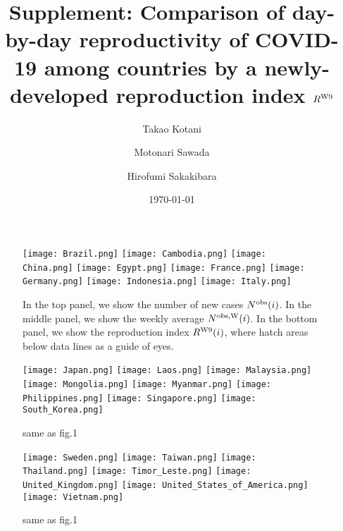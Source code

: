 \documentclass[twocolumn,superscriptaddress,showpacs,preprintnumbers,amsmath,amssymb,prb]{revtex4-1}
\begin{document}
\title{Supplement: Comparison of day-by-day reproductivity of COVID-19 among countries
by a newly-developed reproduction index $R^{\rm W9}$}
\author{Takao Kotani}
\author{Motonari Sawada}
\author{Hirofumi Sakakibara}



\date{\today}
\maketitle




\begin{figure*}[ht]
\texttt{[image: Brazil.png]}
\texttt{[image: Cambodia.png]}
\texttt{[image: China.png]}
\texttt{[image: Egypt.png]}
\texttt{[image: France.png]}
\texttt{[image: Germany.png]}
\texttt{[image: Indonesia.png]}
\texttt{[image: Italy.png]}
 \caption{In the top panel, we show the number of new cases $N^{\rm obs}(i)$.
 In the middle panel, we show the weekly average $N^{\rm obs,W}(i)$.
 In the bottom panel, we show the reproduction index $R^{\rm W9}(i)$,
 where hatch areas below data lines as a guide of eyes.}
 \end{figure*}

\begin{figure*}[ht]
\texttt{[image: Japan.png]}
\texttt{[image: Laos.png]}
\texttt{[image: Malaysia.png]}
\texttt{[image: Mongolia.png]}
\texttt{[image: Myanmar.png]}
\texttt{[image: Philippines.png]}
\texttt{[image: Singapore.png]}
\texttt{[image: South\_Korea.png]}
 \caption{same as fig.1}
 \end{figure*}

\begin{figure*}[ht]
\texttt{[image: Sweden.png]}
\texttt{[image: Taiwan.png]}
\texttt{[image: Thailand.png]}
\texttt{[image: Timor\_Leste.png]}
\texttt{[image: United\_Kingdom.png]}
\texttt{[image: United\_States\_of\_America.png]}
\texttt{[image: Vietnam.png]}
 \caption{same as fig.1}
 \end{figure*}
\end{document}
